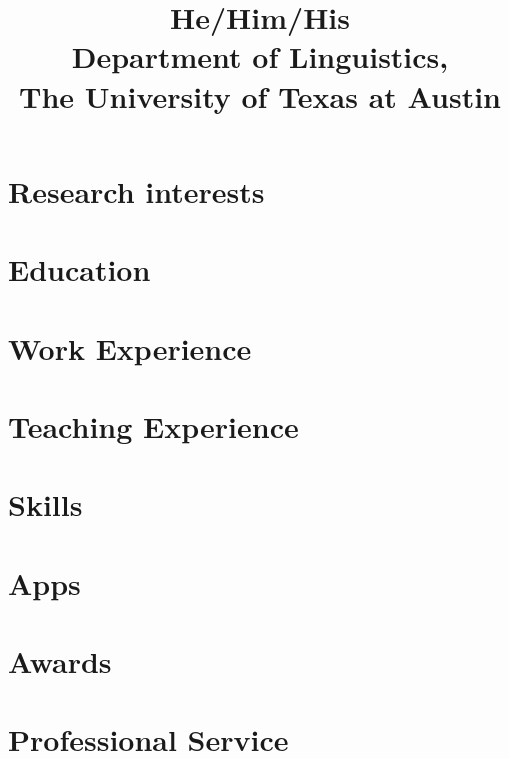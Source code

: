 \documentclass[letterpaper]{practical-cv}
\title{He/Him/His\\Department of Linguistics,\\The University of Texas at Austin}
\begin{document}
\makecvtitle

\section{Research interests}


\section{Education}


\section{Work Experience}


\printbibliography[title=Publications, nottype=talk]

\printbibliography[title=Talks, type=talk]

\section{Teaching Experience}


\section{Skills}


\section{Apps}


\section{Awards}


\section{Professional Service}

\end{document}
